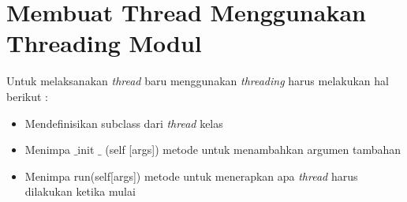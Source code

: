 \documentclass [12pt,a4paper,notitlepage,oneside,bahasa]{article}
\begin{document}
\section{Membuat Thread Menggunakan Threading Modul} 
Untuk melaksanakan \textit{thread}\textit{ }baru menggunakan\textit{ threading} harus melakukan hal berikut : \par
	\begin{itemize}
		\item Mendefinisikan subclass dari \textit{thread} kelas \par
		\item Menimpa  $  \_  $init $  \_  $ (self [args]) metode untuk menambahkan argumen tambahan \par
		\item Menimpa run(self[args]) metode untuk menerapkan apa \textit{thread} harus dilakukan ketika mulai 
	\end{itemize}
\par
\noindent 




\newpage
\end{document}
